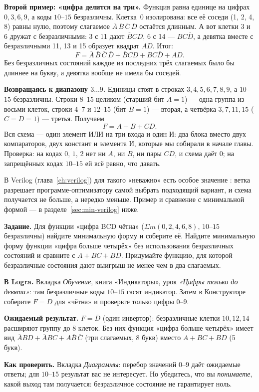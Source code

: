 \textbf{Второй пример: «цифра делится на три».} Функция равна единице на
цифрах $0,3,6,9$, а коды $10$--$15$ безразличны. Клетка~0 изолирована:
все её соседи (1, 2, 4, 8) равны нулю, поэтому слагаемое
$\overline{A}\,\overline{B}\,\overline{C}\,\overline{D}$ остаётся длинным.
А вот клетки 3 и 6 дружат с безразличными: 3 с 11 дают $\overline{B}CD$, 6 с
14 --- $BC\overline{D}$, а девятка вместе с безразличными 11, 13 и 15 образует
квадрат $AD$. Итог:
\[
  F=\overline{A}\,\overline{B}\,\overline{C}\,\overline{D}+\overline{B}CD+BC\overline{D}+AD.
\]
Без безразличных состояний каждое из последних трёх слагаемых было бы
длиннее на букву, а девятка вообще не имела бы соседей.

\textbf{Возвращаясь к диапазону $3\ldots9$.} Единицы стоят в строках
$3,4,5,6,7,8,9$, а $10$--$15$ безразличны. Строки $8$--$15$ целиком
(старший бит $A=1$) --- одна группа из восьми клеток, строки $4$--$7$ и
$12$--$15$ (бит $B=1$) --- вторая, а четвёрка $3,7,11,15$ ($C=D=1$) ---
третья. Получаем
\[
  F=A+B+CD.
\]
Вся схема --- один элемент ИЛИ на три входа и один И: два блока вместо
двух компараторов, двух констант и элемента И, которые мы собирали в начале
главы. Проверка: на кодах $0$, $1$, $2$ нет ни $A$, ни $B$, ни пары $CD$,
и схема даёт $0$; на запрещённых кодах $10$--$15$ ей всё равно, что давать.

\begin{infobox}
В Verilog (глава~\ref{ch:verilog}) для такого «неважно» есть особое
значение : ветка  разрешает
программе-оптимизатору самой выбрать подходящий вариант, и схема
получается не больше, а нередко меньше. Пример и сравнение с минимальной
формой --- в разделе~\ref{sec:min-verilog} ниже.
\end{infobox}

\begin{diybox}
\textbf{Задание.}  Для функции «цифра BCD чётна»
($\Sigma m(0,2,4,6,8)$, $10$--$15$ безразличны) найдите минимальную форму и
соберите её.  Найдите минимальную форму функции «цифра больше
четырёх» без использования безразличных состояний и сравните с
$A+BC+BD$.  Придумайте функцию, для которой безразличные
состояния дают выигрыш не менее чем в два слагаемых.

\textbf{В Logra.} Вкладка \emph{Обучение}, книга «Индикаторы», урок
\emph{«Цифры только до девяти»}: там безразличные коды $10$--$15$ гасят
индикатор. Затем в Конструкторе соберите $F=\overline{D}$ для «чётна»
и проверьте только цифры $0$--$9$.

\textbf{Ожидаемый результат.} $F=\overline{D}$ (один инвертор): безразличные
клетки $10,12,14$ расширяют группу до 8 клеток. Без них функция «цифра
больше четырёх» имеет вид
$\overline{A}BD+\overline{A}BC+A\overline{B}\,\overline{C}$ (три слагаемых,
8 букв) вместо $A+BC+BD$ (5 букв).

\textbf{Как проверить.} Вкладка \emph{Диаграммы}: перебор значений
$0$--$9$ даёт ожидаемые ответы; для $10$--$15$ результат вас не
интересует. Но убедитесь, что вы \emph{понимаете}, какой выход там
получается: безразличное состояние не гарантирует ноль.
\end{diybox}

